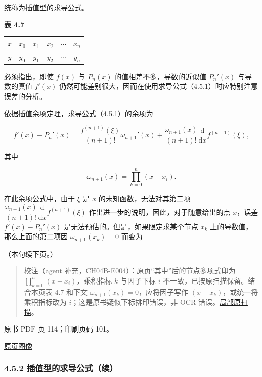 统称为插值型的求导公式。

\textbf{表 4.7}

{\def\LTcaptype{none} %
\begin{longtable}[]{@{}cccccc@{}}
\toprule\noalign{}
\(x\) & \(x_0\) & \(x_1\) & \(x_2\) & \(\cdots\) & \(x_n\) \\
\midrule\noalign{}
\endhead
\bottomrule\noalign{}
\endlastfoot
\(y\) & \(y_0\) & \(y_1\) & \(y_2\) & \(\cdots\) & \(y_n\) \\
\end{longtable}
}

必须指出，即使 \(f(x)\) 与 \(P_n(x)\) 的值相差不多，导数的近似值 \(P_n'(x)\) 与导数的真值 \(f'(x)\) 仍然可能差别很大，因而在使用求导公式（4.5.1）时应特别注意误差的分析。

依据插值余项定理，求导公式（4.5.1）的余项为

\[
f'(x)-P_n'(x)=\frac{f^{(n+1)}(\xi)}{(n+1)!}\omega_{n+1}'(x)
+\frac{\omega_{n+1}(x)}{(n+1)!}\frac{\mathrm{d}}{\mathrm{d}x}f^{(n+1)}(\xi),
\]

其中

\[
\omega_{n+1}(x)=\prod_{k=0}^{n}(x-x_i).
\]

在此余项公式中，由于 \(\xi\) 是 \(x\) 的未知函数，无法对其第二项 \(\dfrac{\omega_{n+1}(x)}{(n+1)!}\dfrac{\mathrm{d}}{\mathrm{d}x}f^{(n+1)}(\xi)\) 作出进一步的说明，因此，对于随意给出的点 \(x\)，误差 \(f'(x)-P_n'(x)\) 是无法预估的。但是，如果限定求某个节点 \(x_k\) 上的导数值，那么上面的第二项因 \(\omega_{n+1}(x_k)=0\) 而变为

（本句续下页。）

\begin{quote}
校注（agent 补充，CH04B-E004）：原页``其中''后的节点多项式印为 \(\prod_{k=0}^{n}(x-x_i)\)，乘积指标 \(k\) 与因子下标 \(i\) 不一致，已按原扫描保留。结合本页表 4.7 和下文 \(\omega_{n+1}(x_k)=0\)，应将因子写作 \((x-x_k)\)，或统一将乘积指标改为 \(i\)；这是原书疑似下标排印错误，非 OCR 错误。\href{verified/assets/ch04b/review-p113-product.png}{局部原扫描}。
\end{quote}

\clearpage

原书 PDF 页 114；印刷页码 101。

\href{source-images/pdf-114.jpeg}{原页图像}

\subsubsection{4.5.2 插值型的求导公式（续）}\label{ch04b-ux63d2ux503cux578bux7684ux6c42ux5bfcux516cux5f0fux7eed}


